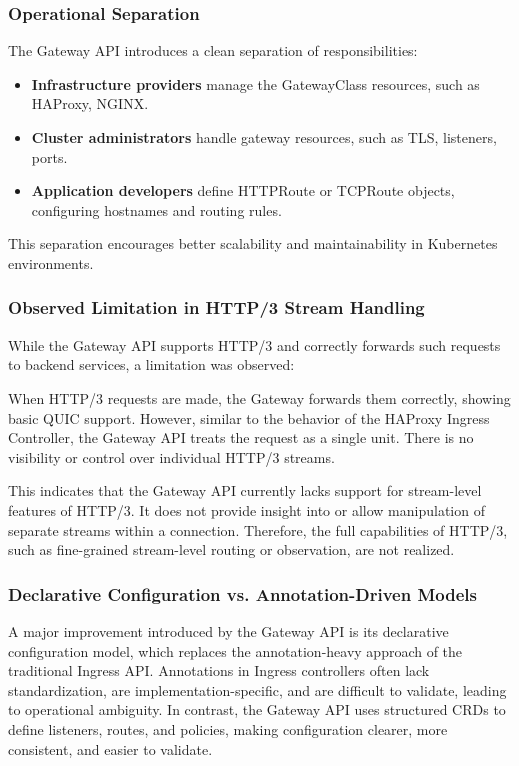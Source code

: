 \subsubsection{Operational Separation}

The Gateway API introduces a clean separation of responsibilities:
\begin{itemize}
  \item \textbf{Infrastructure providers} manage the GatewayClass resources, such as HAProxy, NGINX.
  \item \textbf{Cluster administrators} handle gateway resources, such as TLS, listeners, ports.
  \item \textbf{Application developers} define HTTPRoute or TCPRoute objects, configuring hostnames and routing rules.
\end{itemize}

This separation encourages better scalability and maintainability in Kubernetes environments.

\subsubsection{Observed Limitation in HTTP/3 Stream Handling}

While the Gateway API supports HTTP/3 and correctly forwards such requests to backend services, a limitation was observed:

When HTTP/3 requests are made, the Gateway forwards them correctly, showing basic QUIC support. However, similar to the behavior of the HAProxy Ingress Controller, the Gateway API treats the request as a single unit. There is no visibility or control over individual HTTP/3 streams.

This indicates that the Gateway API currently lacks support for stream-level features of HTTP/3. It does not provide insight into or allow manipulation of separate streams within a connection. Therefore, the full capabilities of HTTP/3, such as fine-grained stream-level routing or observation, are not realized.

\subsubsection{Declarative Configuration vs. Annotation-Driven Models}
A major improvement introduced by the Gateway API is its declarative configuration model, which replaces the annotation-heavy approach of the traditional Ingress API. Annotations in Ingress controllers often lack standardization, are implementation-specific, and are difficult to validate, leading to operational ambiguity. In contrast, the Gateway API uses structured CRDs to define listeners, routes, and policies, making configuration clearer, more consistent, and easier to validate.

